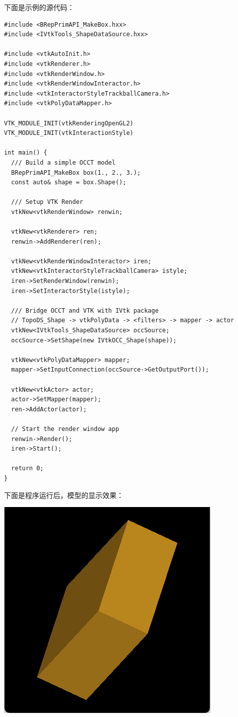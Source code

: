 \documentclass[11pt]{article}
\begin{document}
下面是示例的源代码：

\begin{verbatim}
#include <BRepPrimAPI_MakeBox.hxx>
#include <IVtkTools_ShapeDataSource.hxx>

#include <vtkAutoInit.h>
#include <vtkRenderer.h>
#include <vtkRenderWindow.h>
#include <vtkRenderWindowInteractor.h>
#include <vtkInteractorStyleTrackballCamera.h>
#include <vtkPolyDataMapper.h>

VTK_MODULE_INIT(vtkRenderingOpenGL2)
VTK_MODULE_INIT(vtkInteractionStyle)

int main() {
  /// Build a simple OCCT model
  BRepPrimAPI_MakeBox box(1., 2., 3.);
  const auto& shape = box.Shape();

  /// Setup VTK Render
  vtkNew<vtkRenderWindow> renwin;

  vtkNew<vtkRenderer> ren;
  renwin->AddRenderer(ren);

  vtkNew<vtkRenderWindowInteractor> iren;
  vtkNew<vtkInteractorStyleTrackballCamera> istyle;
  iren->SetRenderWindow(renwin);
  iren->SetInteractorStyle(istyle);

  /// Bridge OCCT and VTK with IVtk package
  // TopoDS_Shape -> vtkPolyData -> <filters> -> mapper -> actor
  vtkNew<IVtkTools_ShapeDataSource> occSource;
  occSource->SetShape(new IVtkOCC_Shape(shape));

  vtkNew<vtkPolyDataMapper> mapper;
  mapper->SetInputConnection(occSource->GetOutputPort());

  vtkNew<vtkActor> actor;
  actor->SetMapper(mapper);
  ren->AddActor(actor);

  // Start the render window app
  renwin->Render();
  iren->Start();

  return 0;
}
\end{verbatim}

下面是程序运行后，模型的显示效果：

\begin{center}
\includegraphics[width=.9\linewidth]{./img/occt-vtk-viewer.png}
\end{center}
\end{document}
